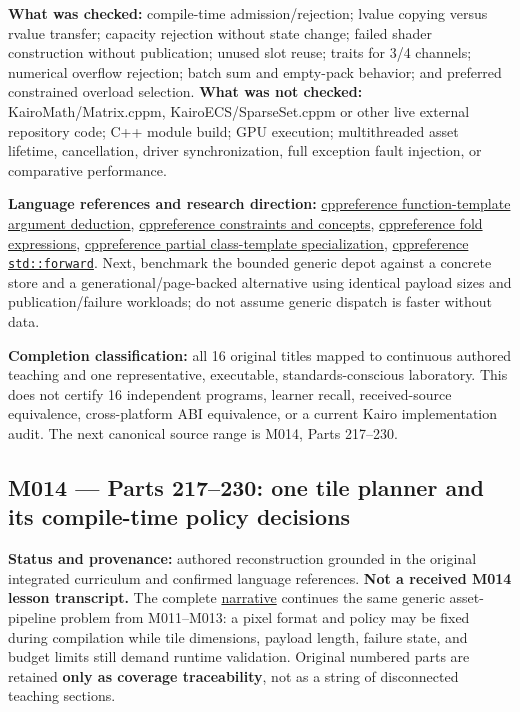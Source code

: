 \textbf{What was checked:} compile-time admission/rejection; lvalue copying versus rvalue transfer; capacity rejection without state change; failed shader construction without publication; unused slot reuse; traits for 3/4 channels; numerical overflow rejection; batch sum and empty-pack behavior; and preferred constrained overload selection. \textbf{What was not checked:} KairoMath/Matrix.cppm, KairoECS/SparseSet.cppm or other live external repository code; C++ module build; GPU execution; multithreaded asset lifetime, cancellation, driver synchronization, full exception fault injection, or comparative performance.

\textbf{Language references and research direction:} \href{https://en.cppreference.com/w/cpp/language/template_argument_deduction}{cppreference function-template argument deduction}, \href{https://en.cppreference.com/w/cpp/language/constraints}{cppreference constraints and concepts}, \href{https://en.cppreference.com/w/cpp/language/fold}{cppreference fold expressions}, \href{https://en.cppreference.com/w/cpp/language/partial_specialization}{cppreference partial class-template specialization}, \href{https://en.cppreference.com/w/cpp/utility/forward}{cppreference \texttt{std::forward}}. Next, benchmark the bounded generic depot against a concrete store and a generational/page-backed alternative using identical payload sizes and publication/failure workloads; do not assume generic dispatch is faster without data.

\textbf{Completion classification:} all 16 original titles mapped to continuous authored teaching and one representative, executable, standards-conscious laboratory. This does not certify 16 independent programs, learner recall, received-source equivalence, cross-platform ABI equivalence, or a current Kairo implementation audit. The next canonical source range is M014, Parts 217--230.

\subsection{M014 --- Parts 217--230: one tile planner and its compile-time policy decisions}\label{appendix-fd090d982a15-m014-parts-217230-one-tile-planner-and-its-compile-time-policy-decisions}

\textbf{Status and provenance:} authored reconstruction grounded in the original integrated curriculum and confirmed language references. \textbf{Not a received M014 lesson transcript.} The complete \hyperref[01-foundations-i-ch005-a-texture-tile-that-chooses-its-work-before-the-frame-begins]{narrative} continues the same generic asset-pipeline problem from M011--M013: a pixel format and policy may be fixed during compilation while tile dimensions, payload length, failure state, and budget limits still demand runtime validation. Original numbered parts are retained \textbf{only as coverage traceability}, not as a string of disconnected teaching sections.


